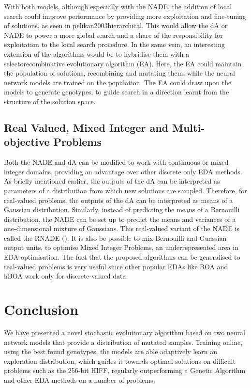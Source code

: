 \documentclass[twoside]{article}
\begin{document}
With both models, although especially with the NADE, the addition of local search could improve performance by providing more exploitation and fine-tuning of solutions, as seen in pelikan2003hierarchical. This would allow the dA or NADE to power a more global search and a share of the responsibility for exploitation to the local search procedure. In the same vein, an interesting extension of the algorithms would be to hybridise them with a selectorecombinative evolutionary algorithm (EA). Here, the EA could maintain the population of solutions, recombining and mutating them, while the neural network models are trained on the population. The EA could draw upon the models to generate genotypes, to guide search in a direction learnt from the structure of the solution space. 
\subsection{Real Valued, Mixed Integer and Multi-objective Problems}
Both the NADE and dA can be modified to work with continuous or mixed-integer domains, providing an advantage over other discrete only EDA methods. As briefly mentioned earlier, the outputs of the dA can be interpreted as parameters of a distribution from which new solutions are sampled. Therefore, for real-valued problems, the outputs of the dA can be interpreted as means of a Gaussian distribution. Similarly, instead of predicting the means of a Bernouilli distribution, the NADE can be set up to predict the means and variances of a one-dimensional mixture of Gaussians. This real-valued variant of the NADE is called the RNADE (\cite{uria2013rnade}). It is also be possible to mix Bernouilli and Guassian output units, to optimise Mixed Integer Problems, an underrepresented area in EDA optimisation. The fact that the proposed algorithms can be generalised to real-valued problems is very useful since other popular EDAs like BOA and hBOA work only for discrete-valued data.

\section{Conclusion}
We have presented a novel stochastic evolutionary algorithm based on two neural network models that provide a distribution of mutated samples. Training online, using the best found genotypes, the models are able adaptively learn an exploration distribution, which guides it towards optimal solutions on difficult problems such as the 256-bit HIFF, regularly outperforming a Genetic Algorithm and other EDA methods on a number of problems.
\small



\end{document}
